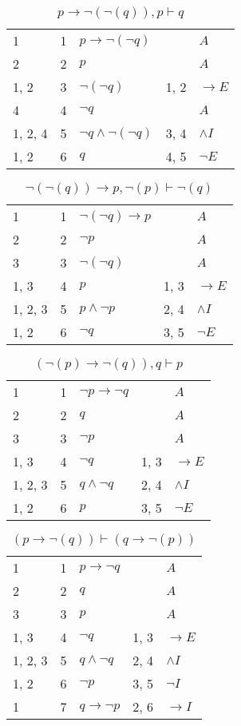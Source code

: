 \documentclass{article}
\begin{document}
\begin{table}[htbp]\caption*{$p → ¬(¬(q)),p ⊢ q$}\centering\begin{tabular}{lrlll}
{1} & 1 & $p→ ¬ (¬q)$ & {} & $A$ \\
{2} & 2 & $p$ & {} & $A$ \\
{1, 2} & 3 & $¬ (¬q)$ & {1, 2} & $→E$ \\
{4} & 4 & $¬q$ & {} & $A$ \\
{1, 2, 4} & 5 & $¬q∧ ¬ (¬q)$ & {3, 4} & $∧I$ \\
{1, 2} & 6 & $q$ & {4, 5} & $¬E$ \\
\end{tabular}
\end{table}
\begin{table}[htbp]\caption*{$¬(¬(q)) → p,¬(p) ⊢ ¬(q)$}\centering\begin{tabular}{lrlll}
{1} & 1 & $¬ (¬q)→p$ & {} & $A$ \\
{2} & 2 & $¬p$ & {} & $A$ \\
{3} & 3 & $¬ (¬q)$ & {} & $A$ \\
{1, 3} & 4 & $p$ & {1, 3} & $→E$ \\
{1, 2, 3} & 5 & $p∧ ¬p$ & {2, 4} & $∧I$ \\
{1, 2} & 6 & $¬q$ & {3, 5} & $¬E$ \\
\end{tabular}
\end{table}
\begin{table}[htbp]\caption*{$(¬(p) → ¬(q)),q ⊢ p$}\centering\begin{tabular}{lrlll}
{1} & 1 & $¬p→ ¬q$ & {} & $A$ \\
{2} & 2 & $q$ & {} & $A$ \\
{3} & 3 & $¬p$ & {} & $A$ \\
{1, 3} & 4 & $¬q$ & {1, 3} & $→E$ \\
{1, 2, 3} & 5 & $q∧ ¬q$ & {2, 4} & $∧I$ \\
{1, 2} & 6 & $p$ & {3, 5} & $¬E$ \\
\end{tabular}
\end{table}
\begin{table}[htbp]\caption*{$(p → ¬(q)) ⊢ (q → ¬(p))$}\centering\begin{tabular}{lrlll}
{1} & 1 & $p→ ¬q$ & {} & $A$ \\
{2} & 2 & $q$ & {} & $A$ \\
{3} & 3 & $p$ & {} & $A$ \\
{1, 3} & 4 & $¬q$ & {1, 3} & $→E$ \\
{1, 2, 3} & 5 & $q∧ ¬q$ & {2, 4} & $∧I$ \\
{1, 2} & 6 & $¬p$ & {3, 5} & $¬I$ \\
{1} & 7 & $q→ ¬p$ & {2, 6} & $→I$ \\
\end{tabular}
\end{table}
\end{document}
